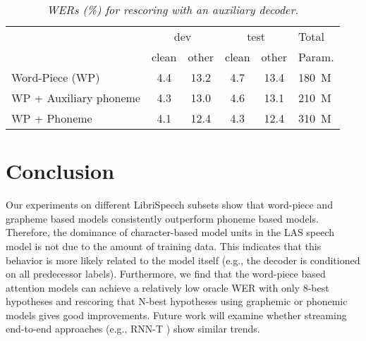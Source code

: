 \documentclass[a4paper]{article}
\begin{document}
\begin{table}[h]
	\centering
\setlength{\tabcolsep}{0.3em}
	\caption{\it WERs (\%) for rescoring with an auxiliary decoder.}
	\vspace{-3mm}
	\label{tab:aux}
\begin{tabular}{ |l|c|c|c|c|l|} \hline
		\multirow{2}{*}{ }  & \multicolumn{2}{|c|}{dev} & \multicolumn{2}{|c|}{test}  & Total  \\ \cline{2-5}
		& clean & other & clean & other & Param.   \\ \hline
		Word-Piece (WP)           & 4.4 & 13.2 & 4.7 & 13.4  &180~M  \\
		WP + Auxiliary phoneme    &  4.3 & 13.0 &  4.6 &  13.1 &  210~M\\
		WP + Phoneme              &  4.1  & 12.4 &  4.3 &  12.4 & 310~M\\ \hline
		
	\end{tabular}
\end{table}
\vspace{-6mm}
\section{Conclusion}
Our experiments on different LibriSpeech subsets show that word-piece and grapheme based models
consistently outperform phoneme based models.
Therefore, the dominance of character-based model units in the LAS speech model
is not due to the amount of training data. This indicates that this behavior is more likely
related to the model itself (e.g., the decoder is conditioned on all predecessor labels).
Furthermore, we find that the word-piece based attention models can achieve a relatively low
oracle WER with only 8-best hypotheses and rescoring that N-best hypotheses using
graphemic or phonemic models gives good improvements.
Future work will examine whether streaming end-to-end approaches
(e.g., RNN-T \cite{graves2012sequence,RaoSP17}) show similar trends.
\label{sec:foot}
\clearpage



\end{document}
